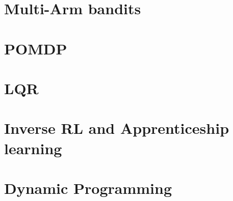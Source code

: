 \documentclass[12pt]{book}
\begin{document}
\chapter{ Multi-Arm bandits}
\label{chapter:MAB}




\chapter{POMDP}
\label{chapter:POMDP}


\chapter{LQR}
\label{chapter:LQR}


\chapter{Inverse RL and Apprenticeship learning}
\label{chapter:IRL}


\appendix

\chapter{Dynamic Programming}
\label{chapter:dp}



%

%
%
\end{document}

